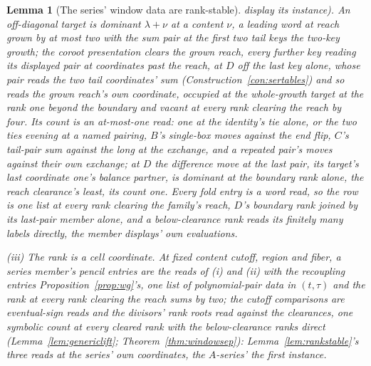 \documentclass[11pt]{article}
\newtheorem{lemma}{Lemma}
\theoremstyle{definition}
\begin{document}
\begin{lemma}[The series' window data are rank-stable]
display its instance). An off-diagonal target is dominant
$\lambda+\nu$ at a content $\nu$, a leading word at reach grown
by at most two with the sum pair at the first two tail keys the
two-key growth; the coroot presentation clears the grown reach,
every further key reading its displayed pair at coordinates past
the reach, at $D$ off the last key alone, whose pair reads the two
tail coordinates' sum (Construction~\ref{con:sertables}) and so
reads the grown reach's own coordinate, occupied at the
whole-growth target at the rank one beyond the boundary and vacant
at every rank clearing the reach by four. Its count is an
at-most-one read: one at the
identity's tie alone, or the two ties evening at a named
pairing, $B$'s single-box moves against the end flip, $C$'s
tail-pair sum against the long at the exchange, and a repeated
pair's moves against their own exchange; at $D$ the difference
move at the last pair, its target's last coordinate one's
balance partner, is dominant at the boundary rank alone, the
reach clearance's least, its count one. Every fold entry is a
word read, so the row is one list at every rank clearing the
family's reach, $D$'s boundary rank joined by its last-pair
member alone, and a below-clearance rank reads its finitely many
labels directly, the member displays' own evaluations.

\emph{(iii) The rank is a cell coordinate.} At fixed content
cutoff, region and fiber, a series member's pencil entries are
the reads of (i) and (ii) with the recoupling entries
Proposition~\ref{prop:wg}'s, one list of polynomial-pair data in
$(t,\tau)$ and the rank at every rank clearing the reach sums by
two; the cutoff comparisons are eventual-sign reads and the
divisors' rank roots read against the clearances, one symbolic
count at every cleared rank with the below-clearance ranks
direct (Lemma~\ref{lem:genericlift};
Theorem~\ref{thm:windowsep}): Lemma~\ref{lem:rankstable}'s three
reads at the series' own coordinates, the $A$-series' the first
instance.
\end{lemma}
\end{document}
